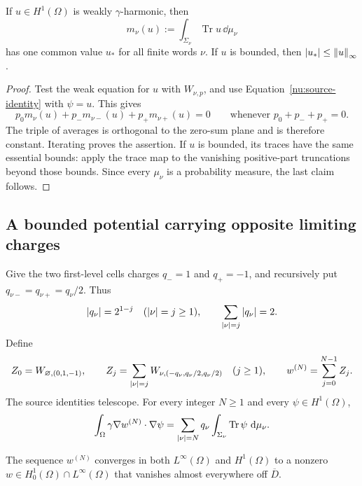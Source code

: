 \begin{lemma}\label{nu:equal-averages}
If \(u\in H^1(\Omega)\) is weakly \(\gamma\)-harmonic, then
\[
 m_\nu(u):=\int_{\Sigma_\nu}\operatorname{Tr}u\,\dd\mu_\nu
\]
has one common value \(u_*\) for all finite words \(\nu\).
If \(u\) is bounded, then \(\left\lvert u_*\right\rvert\le\left\lVert u\right\rVert_\infty\).
\end{lemma}

\begin{proof}
Test the weak equation for \(u\) with \(W_{\nu,p}\), and use
Equation~\eqref{nu:source-identity} with \(\psi=u\). This gives
\[
 p_0m_\nu(u)+p_-m_{\nu-}(u)+p_+m_{\nu+}(u)=0
 \qquad\text{whenever }p_0+p_-+p_+=0.
\]
The triple of averages is orthogonal to the zero-sum plane and is
therefore constant. Iterating proves the assertion. If \(u\) is
bounded, its traces have the same essential bounds: apply the trace
map to the vanishing positive-part truncations beyond those bounds.
Since every \(\mu_\nu\) is a probability measure, the last claim
follows.
\end{proof}

\subsection{A bounded potential carrying opposite limiting charges}

Give the two first-level cells charges \(q_-=1\) and \(q_+=-1\),
and recursively put \(q_{\nu-}=q_{\nu+}=q_\nu/2\). Thus
\begin{equation}\label{nu:charges}
 \left\lvert q_\nu\right\rvert=2^{1-j}\quad(\left\lvert \nu\right\rvert=j\ge1),
 \qquad \sum_{\left\lvert \nu\right\rvert=j}\left\lvert q_\nu\right\rvert=2.
\end{equation}
Define
\[
 Z_0=W_{\varnothing,(0,1,-1)},\qquad
 Z_j=\sum_{\left\lvert \nu\right\rvert=j}
       W_{\nu,(-q_\nu,q_\nu/2,q_\nu/2)}\quad(j\ge1),
 \qquad
 w^{(N)}=\sum_{j=0}^{N-1}Z_j.
\]
The source identities telescope. For every integer \(N\ge1\) and
every \(\psi\in H^1(\Omega)\),
\begin{equation}\label{nu:finite-source}
 \int_\Omega\gamma\nabla w^{(N)}\cdot\nabla\psi
 =\sum_{\left\lvert \nu\right\rvert=N}q_\nu
      \int_{\Sigma_\nu}\operatorname{Tr}\psi\,\,\mathrm d\mu_\nu.
\end{equation}

\begin{lemma}\label{nu:potential}
The sequence \(w^{(N)}\) converges in both \(L^\infty(\Omega)\)
and \(H^1(\Omega)\) to a nonzero
\(w\in H^1_0(\Omega)\cap L^\infty(\Omega)\) that vanishes
almost everywhere off \(\overline D\).
\end{lemma}

